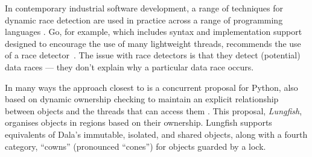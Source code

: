 

In contemporary industrial software development, a range of techniques
for dynamic race detection are used in practice across a range of
programming languages
\cite{hong2015survey}.  Go, for
example, which includes syntax and implementation support designed to
encourage the use of many lightweight threads, recommends the use
of a race detector~\cite{GoCACM2022}.
The issue with race detectors is that they detect (potential)
data races --- they don't explain why a particular data race
occurs.



In many ways the approach closest to \dala is a concurrent proposal for Python, also based on
dynamic ownership checking to maintain an explicit relationship
between objects and the threads that can access them
\cite{pyrona2025}. This proposal, \textit{Lungfish}, organises objects
in regions based on their ownership. Lungfish supports equivalents of
Dala's immutable, isolated, and shared objects, along with a fourth
category, ``cowns'' (pronounced ``cones'') for objects guarded by a
lock.



